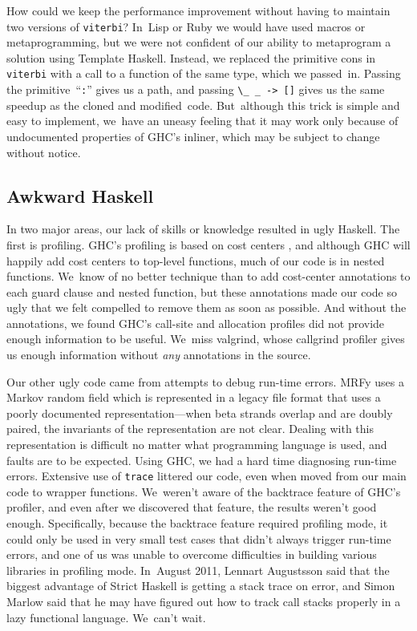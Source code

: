 \documentclass[preprint,nonatbib,blockstyle,nocopyrightspace,times]{sigplanconf}
\newcommand\seclabel[1]{\label{sec:#1}}
\let\cite\citep
\begin{document}
How could we keep the performance improvement without having to
maintain two versions of \texttt{viterbi}?
In~Lisp or Ruby we would have used macros or metaprogramming,
but we were not confident of our ability to metaprogram a solution
using Template Haskell.
Instead, we replaced the primitive cons in \texttt{viterbi} with a
call to a function of the same type, which we passed~in.
Passing the primitive~``\texttt{:}'' gives us a path,
and passing \verb+\_ _ -> []+ gives us the same
speedup as the cloned and modified~code.
But~although
this trick is simple and easy to implement, 
we~have an uneasy feeling that it may work only because of undocumented
properties of GHC's inliner, which may be subject to change without
notice. 

\subsection{Awkward Haskell}

\seclabel{awkward-profiling}

In two major areas, our lack of skills or knowledge resulted in ugly
Haskell.
The first is profiling.
GHC's profiling is based on cost centers \cite{sansom-pj},
and although GHC 
will happily add cost centers to top-level 
functions, much of our code is in nested functions.
We~know of no better technique than to add cost-center annotations to
each guard clause and nested function,
but these annotations made our code so ugly that we felt compelled to
remove them as soon as possible.
And without the annotations, we found GHC's call-site and allocation
profiles did not provide enough information to be useful.
We~miss valgrind, whose callgrind profiler gives us enough information
without \emph{any} annotations in the source.

Our other ugly code came from  attempts to debug
run-time errors.
MRFy uses a Markov random field which is represented in a legacy file
format that uses a poorly documented representation---when beta
strands overlap and are doubly paired, the invariants of the
representation are not clear.
Dealing with this representation is difficult no matter what
programming language is used, and faults are to be expected.
Using GHC, we had a hard time diagnosing run-time errors.
Extensive use of 
\texttt{trace} 
littered our code,
even when moved from our main code to wrapper functions.
We~weren't aware of the backtrace feature of GHC's profiler,
and even after we discovered that feature, the results weren't good enough.
Specifically, because the backtrace feature required profiling mode,
it could only be used in very small test cases that didn't always trigger
run-time errors, and one of us was unable to overcome difficulties in building
various libraries in profiling mode.
In~August 2011, 
Lennart Augustsson said that the biggest advantage of Strict
Haskell is getting a stack trace on error,
and Simon Marlow said that he may have figured out how to track call
stacks properly in a lazy functional language.
We~can't wait.
\end{document}
